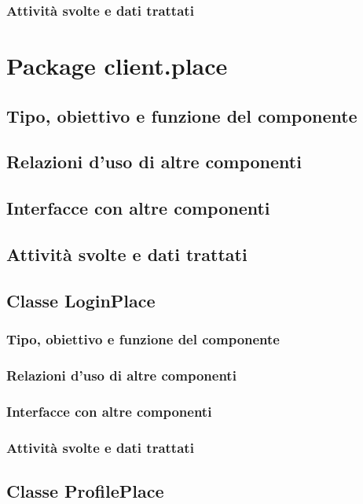 \subsubsection*{Attivit\`a svolte e dati trattati}

\newpage
\section{Package client.place} %
\subsection*{Tipo, obiettivo e funzione del componente}
\subsection*{Relazioni d'uso di altre componenti}
\subsection*{Interfacce con altre componenti}
\subsection*{Attivit\`a svolte e dati trattati}

\subsection{Classe LoginPlace}
\subsubsection*{Tipo, obiettivo e funzione del componente}
\subsubsection*{Relazioni d'uso di altre componenti}
\subsubsection*{Interfacce con altre componenti}
\subsubsection*{Attivit\`a svolte e dati trattati}

\subsection{Classe ProfilePlace}
